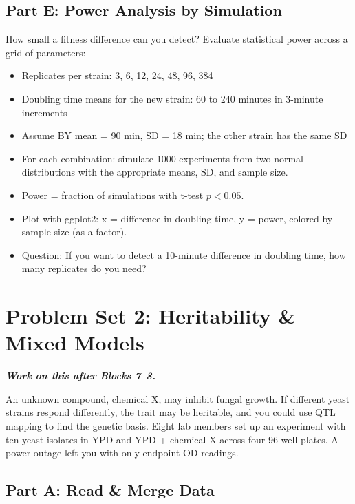 \subsection{Part E: Power Analysis by Simulation}

How small a fitness difference can you detect? Evaluate statistical power across a grid of parameters:

\begin{itemize}[nosep]
  \item Replicates per strain: 3, 6, 12, 24, 48, 96, 384
  \item Doubling time means for the new strain: 60 to 240 minutes in 3-minute increments
  \item Assume BY mean = 90 min, SD = 18 min; the other strain has the same SD
\end{itemize}

\begin{dobox}[Tasks]
\begin{itemize}[nosep]
  \item For each combination: simulate 1000 experiments from two normal distributions with the appropriate means, SD, and sample size.
  \item Power = fraction of simulations with t-test $p < 0.05$.
  \item Plot with ggplot2: x = difference in doubling time, y = power, colored by sample size (as a factor).
  \item Question: If you want to detect a 10-minute difference in doubling time, how many replicates do you need?
\end{itemize}
\end{dobox}


\section{Problem Set 2: Heritability \& Mixed Models}\label{ps:2}

\textit{\textbf{Work on this after Blocks 7--8.}}

An unknown compound, chemical X, may inhibit fungal growth. If different yeast strains respond differently, the trait may be heritable, and you could use QTL mapping to find the genetic basis. Eight lab members set up an experiment with ten yeast isolates in YPD and YPD + chemical X across four 96-well plates. A power outage left you with only endpoint OD readings.

\subsection{Part A: Read \& Merge Data}


